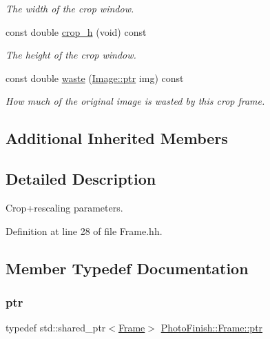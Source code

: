 \begin{DoxyCompactItemize}
\begin{DoxyCompactList}\small\item\em The width of the crop window. \end{DoxyCompactList}\item 
const double \hyperlink{class_photo_finish_1_1_frame_a69f8370ef64448ad0f0723c6ab8a23d3}{crop\+\_\+h} (void) const
\begin{DoxyCompactList}\small\item\em The height of the crop window. \end{DoxyCompactList}\item 
const double \hyperlink{class_photo_finish_1_1_frame_a7411d047a4825aa6180d6db316b38f3d}{waste} (\hyperlink{class_photo_finish_1_1_image_ab336203305ed3a1397d7245063353b5a}{Image\+::ptr} img) const
\begin{DoxyCompactList}\small\item\em How much of the original image is wasted by this crop frame. \end{DoxyCompactList}\end{DoxyCompactItemize}
\subsection*{Additional Inherited Members}


\subsection{Detailed Description}
Crop+rescaling parameters. 

Definition at line 28 of file Frame.\+hh.



\subsection{Member Typedef Documentation}
\mbox{\label{class_photo_finish_1_1_frame_aaf5eaa56b8096024c0d45ad9e7f5e6c1}} 
\subsubsection{\texorpdfstring{ptr}{ptr}}
{\footnotesize\ttfamily typedef std\+::shared\+\_\+ptr$<$\hyperlink{class_photo_finish_1_1_frame}{Frame}$>$ \hyperlink{class_photo_finish_1_1_frame_aaf5eaa56b8096024c0d45ad9e7f5e6c1}{Photo\+Finish\+::\+Frame\+::ptr}}



